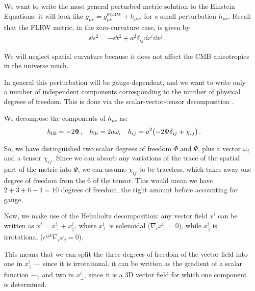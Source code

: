 \documentclass[main.tex]{subfiles}
\begin{document}
\begin{bluebox}
We want to write the most general perturbed metric solution to the Einstein Equations: it will look like \(g_{\mu \nu } = g_{\mu \nu }^{\text{FLRW}} + h_{\mu \nu }\), for a small perturbation \(h_{\mu \nu }\). Recall that the FLRW metric, in the zero-curvature case, is given by 
%
\begin{align}
\dd{s^2} =  - \dd{t^2} + a^2 \delta_{ij} \dd{x^{i}} \dd{x^{j}}
\,.
\end{align}
%

We will neglect spatial curvature because it does not affect the CMB anisotropies in the universe much.

In general this perturbation will be gauge-dependent, and we want to write only a number of independent components corresponding to the number of physical degrees of freedom. This is done via the scalar-vector-tensor decomposition \cite[section 2.1]{bertschingerCosmologicalPerturbationTheory2000a}.

We decompose the components of \(h_{\mu \nu }\) as: 
%
\begin{align}
h_{00} &= -2 \Phi \,, &
h_{0i} &= 2a \omega_{i} &
h_{ij} &= a^2 \qty(-2 \Psi \delta_{ij} + \chi_{ij})
\,.
\end{align}

So, we have distinguished two scalar degrees of freedom \(\Phi \) and \(\Psi \), plus a vector \(\omega_{i}\) and a tensor \(\chi_{ij}\).
Since we can absorb any variations of the trace of the spatial part of the metric into \(\Psi \), we can assume \(\chi_{ij}\) to be traceless, which takes away one degree of freedom from the 6 of the tensor. 
This would mean we have  \(2+ 3 + 6 -1 = 10\) degrees of freedom, the right amount before accounting for gauge. 

Now, we make use of the Helmholtz decomposition: any vector field \(x^{i}\) can be written as \(x^{i} = x^{i}_{\perp} + x^{i}_{\parallel}\), where \(x^{i}_{\perp}\) is solenoidal (\(\nabla_{i} x^{i}_{\perp} = 0\)), while \(x^{i}_{\parallel}\) is irrotational (\(\epsilon^{ijk}\nabla_{i}x_{j} = 0\)). 

This means that we can split the three degrees of freedom of the vector field into one in \(x^{i}_{\parallel}\) --- since it is irrotational, it can be written as the gradient of a scalar function ---, and two in \(x^{i}_{\perp}\), since it is a 3D vector field for which one component is determined. 


\end{bluebox}
\end{document}
